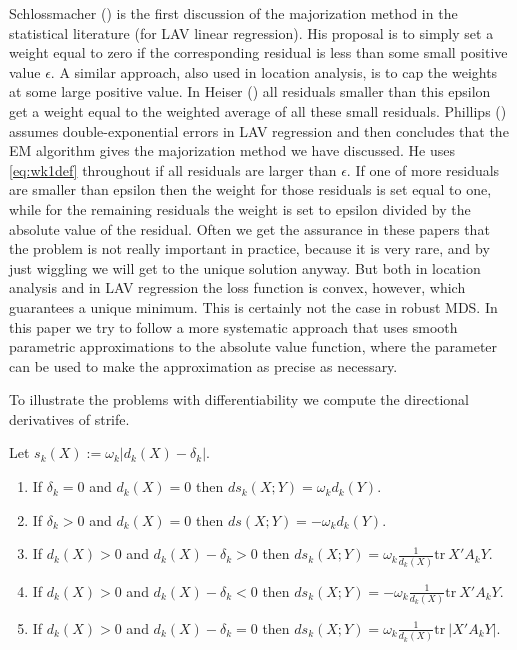 \documentclass[
  12pt,
  letterpaper,
  DIV=11,
  numbers=noendperiod]{scrartcl}
\providecommand{\tightlist}{%
  \setlength{\itemsep}{0pt}\setlength{\parskip}{0pt}}\usepackage{longtable,booktabs,array}
\theoremstyle{definition}
\theoremstyle{plain}
\theoremstyle{plain}
\theoremstyle{remark}
\begin{document}
Schlossmacher () is the first
discussion of the majorization method in the statistical literature (for
LAV linear regression). His proposal is to simply set a weight equal to
zero if the corresponding residual is less than some small positive
value \(\epsilon\). A similar approach, also used in location analysis,
is to cap the weights at some large positive value. In Heiser
() all residuals smaller than this epsilon
get a weight equal to the weighted average of all these small residuals.
Phillips () assumes double-exponential
errors in LAV regression and then concludes that the EM algorithm gives
the majorization method we have discussed. He uses \eqref{eq:wk1def}
throughout if all residuals are larger than \(\epsilon\). If one of more
residuals are smaller than epsilon then the weight for those residuals
is set equal to one, while for the remaining residuals the weight is set
to epsilon divided by the absolute value of the residual. Often we get
the assurance in these papers that the problem is not really important
in practice, because it is very rare, and by just wiggling we will get
to the unique solution anyway. But both in location analysis and in LAV
regression the loss function is convex, however, which guarantees a
unique minimum. This is certainly not the case in robust MDS. In this
paper we try to follow a more systematic approach that uses smooth
parametric approximations to the absolute value function, where the
parameter can be used to make the approximation as precise as necessary.

To illustrate the problems with differentiability we compute the
directional derivatives of strife.

Let \(s_k(X):=\omega_k|d_k(X)-\delta_k|\).

\begin{enumerate}
\def\labelenumi{\arabic{enumi}.}
\tightlist
\item
  If \(\delta_k=0\) and \(d_k(X)=0\) then \(ds_k(X;Y)=\omega_kd_k(Y)\).
\item
  If \(\delta_k>0\) and \(d_k(X)=0\) then \(ds(X;Y)=-\omega_kd_k(Y)\).
\item
  If \(d_k(X)>0\) and \(d_k(X)-\delta_k>0\) then
  \(ds_k(X;Y)=\omega_k\frac{1}{d_k(X)}\text{tr}\ X'A_kY\).
\item
  If \(d_k(X)>0\) and \(d_k(X)-\delta_k<0\) then
  \(ds_k(X;Y)=-\omega_k\frac{1}{d_k(X)}\text{tr}\ X'A_kY\).
\item
  If \(d_k(X)>0\) and \(d_k(X)-\delta_k=0\) then
  \(ds_k(X;Y)=\omega_k\frac{1}{d_k(X)}\text{tr}\ |X'A_kY|\).
\end{enumerate}
\end{document}
